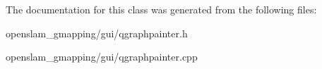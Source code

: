 The documentation for this class was generated from the following files\+:\begin{DoxyCompactItemize}
\item 
openslam\+\_\+gmapping/gui/qgraphpainter.\+h\item 
openslam\+\_\+gmapping/gui/qgraphpainter.\+cpp\end{DoxyCompactItemize}
